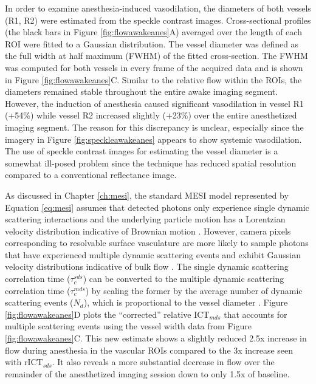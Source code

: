 In order to examine anesthesia-induced vasodilation, the diameters of both vessels (R1, R2) were estimated from the speckle contrast images. Cross-sectional profiles (the black bars in Figure \ref{fig:flowawakeanes}A) averaged over the length of each ROI were fitted to a Gaussian distribution. The vessel diameter was defined as the full width at half maximum (FWHM) of the fitted cross-section. The FWHM was computed for both vessels in every frame of the acquired data and is shown in Figure \ref{fig:flowawakeanes}C. Similar to the relative flow within the ROIs, the diameters remained stable throughout the entire awake imaging segment. However, the induction of anesthesia caused significant vasodilation in vessel R1 (+54\%) while vessel R2 increased slightly (+23\%) over the entire anesthetized imaging segment. The reason for this discrepancy is unclear, especially since the imagery in Figure \ref{fig:speckleawakeanes} appears to show systemic vasodilation. The use of speckle contrast images for estimating the vessel diameter is a somewhat ill-posed problem since the technique has reduced spatial resolution compared to a conventional reflectance image.

As discussed in Chapter \ref{ch:mesi}, the standard MESI model represented by Equation \ref{eq:mesi} assumes that detected photons only experience single dynamic scattering interactions and the underlying particle motion has a Lorentzian velocity distribution indicative of Brownian motion \cite{Parthasarathy:2008el}. However, camera pixels corresponding to resolvable surface vasculature are more likely to sample photons that have experienced multiple dynamic scattering events \cite{Davis:2014kc} and exhibit Gaussian velocity distributions indicative of bulk flow \cite{Kazmi:2015du}. The single dynamic scattering correlation time ($\tau_c^{sds}$) can be converted to the multiple dynamic scattering correlation time ($\tau_c^{mds}$) by scaling the former by the average number of dynamic scattering events ($N_d$), which is proportional to the vessel diameter \cite{Kazmi:2015du}. Figure \ref{fig:flowawakeanes}D plots the ``corrected'' relative ICT$_{mds}$ that accounts for multiple scattering events using the vessel width data from Figure \ref{fig:flowawakeanes}C. This new estimate shows a slightly reduced 2.5x increase in flow during anesthesia in the vascular ROIs compared to the 3x increase seen with rICT$_{sds}$. It also reveals a more substantial decrease in flow over the remainder of the anesthetized imaging session down to only 1.5x of baseline.

